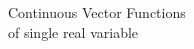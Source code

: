 \documentclass[aspectratio=169]{beamer}
\begin{document}
\begin{frame}[plain]
    \begin{center}
        {\Large Continuous Vector Functions}\\[1cm]
        of single real variable
    \end{center}
\end{frame}
\end{document}
